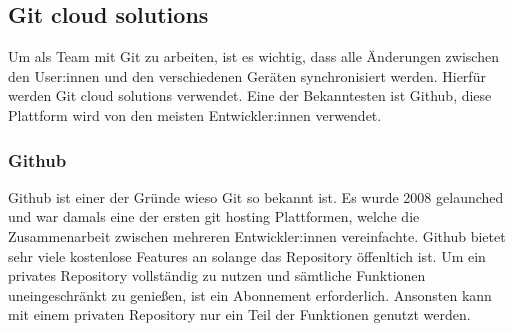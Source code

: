 \subsection{Git cloud solutions}

Um als Team mit Git zu arbeiten, ist es wichtig, dass alle Änderungen zwischen den User:innen und den verschiedenen Geräten synchronisiert werden. Hierfür werden Git cloud solutions verwendet. Eine der Bekanntesten ist Github, diese Plattform wird von den meisten Entwickler:innen verwendet.

\subsubsection{Github}

Github ist einer der Gründe wieso Git so bekannt ist. Es wurde 2008 gelaunched und war damals eine der ersten git hosting Plattformen, welche die Zusammenarbeit zwischen mehreren Entwickler:innen vereinfachte. Github bietet sehr viele kostenlose Features an solange das Repository öffenltich ist. Um ein privates Repository vollständig zu nutzen und sämtliche Funktionen uneingeschränkt zu genießen, ist ein Abonnement erforderlich. Ansonsten kann mit einem privaten Repository nur ein Teil der Funktionen genutzt werden.

\cite{Github_1}
\cite{Github_2}